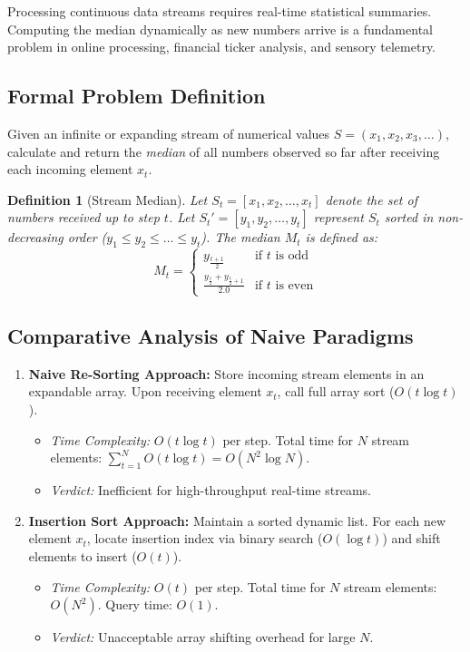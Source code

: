 \documentclass[10pt,journal,compsoc,onecolumn]{IEEEtran}
\newtheorem{definition}[theorem]{Definition}
\begin{document}
Processing continuous data streams requires real-time statistical summaries. Computing the median dynamically as new numbers arrive is a fundamental problem in online processing, financial ticker analysis, and sensory telemetry.

\subsection{Formal Problem Definition}

Given an infinite or expanding stream of numerical values $S = (x_1, x_2, x_3, \dots)$, calculate and return the \emph{median} of all numbers observed so far after receiving each incoming element $x_t$.

\begin{definition}[Stream Median]
Let $S_t = [x_1, x_2, \dots, x_t]$ denote the set of numbers received up to step $t$. Let $S_t' = [y_1, y_2, \dots, y_t]$ represent $S_t$ sorted in non-decreasing order ($y_1 \le y_2 \le \dots \le y_t$). The median $M_t$ is defined as:
\[
M_t = \begin{cases}
y_{\frac{t+1}{2}} & \text{if } t \text{ is odd} \\[8pt]
\frac{y_{\frac{t}{2}} + y_{\frac{t}{2} + 1}}{2.0} & \text{if } t \text{ is even}
\end{cases}
\]
\end{definition}

\subsection{Comparative Analysis of Naive Paradigms}

\begin{enumerate}
    \item \textbf{Naive Re-Sorting Approach:} Store incoming stream elements in an expandable array. Upon receiving element $x_t$, call full array sort ($O(t \log t)$).
    \begin{itemize}
        \item \emph{Time Complexity:} $O(t \log t)$ per step. Total time for $N$ stream elements: $\sum_{t=1}^N O(t \log t) = O(N^2 \log N)$.
        \item \emph{Verdict:} Inefficient for high-throughput real-time streams.
    \end{itemize}
    \item \textbf{Insertion Sort Approach:} Maintain a sorted dynamic list. For each new element $x_t$, locate insertion index via binary search ($O(\log t)$) and shift elements to insert ($O(t)$).
    \begin{itemize}
        \item \emph{Time Complexity:} $O(t)$ per step. Total time for $N$ stream elements: $O(N^2)$. Query time: $O(1)$.
        \item \emph{Verdict:} Unacceptable array shifting overhead for large $N$.
    \end{itemize}
\end{enumerate}
\end{document}
